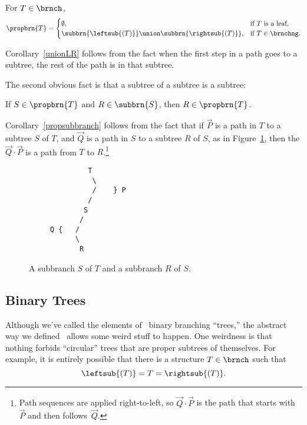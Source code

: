 \begin{definition}
\begin{corollary}\label{unionLR}
For $T \in \brnch$,
\[
\propbrn{T} =
\begin{cases}
  \emptyset, & \text{if $T$ is a leaf},\\
  \subbrn{\leftsub{(T)}} \union \subbrn{\rightsub{(T)}},
            & \text{if}\ T \in \brnchng.
\end{cases}
\]
\end{corollary}

Corollary~\ref{unionLR} follows from the fact when the first step in a
path goes to a subtree, the rest of the path is in that subtree.

The second obvious fact is that a subtree of a subtree is a subtree:

\begin{corollary}\label{propsubbranch}
If  $S \in \propbrn{T}$ and $R \in \subbrn{S}$, then $R \in \propbrn{T}$.
\end{corollary}

Corollary~\ref{propsubbranch} follows from the fact that if $\vec{P}$
is a path in $T$ to a subtree $S$ of $T$, and $\vec{Q}$ is a path in
$S$ to a subtree $R$ of $S$, as in Figure~\ref{PQdown}, then the
 $\vec{Q} \cdot \vec{P}$ is a path from $T$ to
$R$.\footnote{Path sequences are applied right-to-left, so $\vec{Q}
  \cdot \vec{P}$ is the path that starts with~$\vec{P}$ and then
  follows~$\vec{Q}$.}


\begin{figure}


\begin{center}
\begin{verbatim}
              T
               \
               /    } P
              /
             S
            /
     Q {   /
           \
            R
\end{verbatim}   
\end{center}

\caption{A subbranch $S$ of $T$ and  a subbranch $R$ of $S$.}

\label{PQdown}

\end{figure}

\subsection{Binary Trees}
Although we've called the elements of \brnch\ binary branching
``trees,'' the abstract way we defined \brnch\ allows some weird stuff
to happen.  One weirdness is that nothing forbids ``circular'' trees
that are proper subtrees of themselves.
\iffalse
For example, it is entirely
possible that there is a structure $T \in \brnch$ such that
\textcolor{red}{
\[
\leftsub{(T)} = T = \rightsub{(T)}.
\]}


\end{definition}

